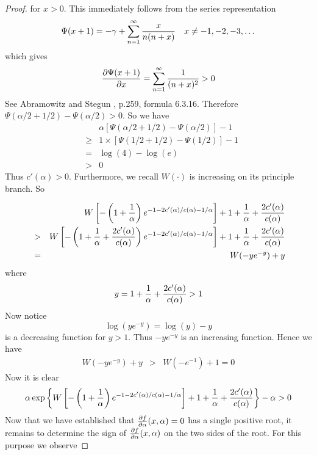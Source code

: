 \begin{subappendices}
\begin{proof}
\begin{minipage}{0.5\textwidth}
    for $x > 0$. This immediately follows from the series
    representation
    \[
    \Psi(x + 1) = -\gamma + \sum_{n=1}^\infty {x \over n(n + x)}
    \quad x \neq -1, -2, -3,\dots
    \]
    which gives
    \[
    {\partial \Psi(x + 1) \over \partial x}
    = \sum_{n=1}^\infty {1 \over (n + x)^2} > 0
    \]
    See Abramowitz and Stegun \cite{abramowitz1972handbook}, p.259,
    formula 6.3.16. Therefore $\Psi(\alpha/2 + 1/2) - \Psi(\alpha/2) > 0$.
    So we have
    \begin{eqnarray*}
      && \alpha \left[
        \Psi(\alpha/2 + 1/2) - \Psi(\alpha/2)
      \right] - 1 \\
      &\geq& 1 \times \left[
        \Psi(1/2 + 1/2) - \Psi(1/2)
      \right] - 1 \\
      &=& \log(4) - \log(e) \\
      &>& 0
    \end{eqnarray*}
    Thus $c'(\alpha) > 0$. Furthermore, we recall
    $W(\cdot)$ is increasing on its principle branch. So
  \end{minipage}
  \begin{eqnarray*}
    &&
    W\left[
      -\left( 1 + {1 \over \alpha} \right)
      e^{-1 - 2 c'(\alpha)/c(\alpha) - 1/\alpha}
    \right]
    + 1 + {1 \over \alpha} + {2 c'(\alpha) \over c(\alpha)} \\
    &>& 
    W\left[
      -\left( 1 + {1 \over \alpha} + {2 c'(\alpha) \over c(\alpha)} \right)
      e^{-1 - 2 c'(\alpha)/c(\alpha) - 1/\alpha}
    \right]
    + 1 + {1 \over \alpha} + {2 c'(\alpha) \over c(\alpha)} \\
    &=& W(-y e^{-y}) + y
  \end{eqnarray*}
  where
  \[
  y = 1 + {1 \over \alpha} + {2 c'(\alpha) \over c(\alpha)} > 1
  \]
  Now notice
  \[
  \log(y e^{-y}) = \log(y) - y
  \]
  is a decreasing function for $y > 1$. Thus $-y e^{-y}$ is an
  increasing function. Hence we have
  \begin{eqnarray*}
    W(-y e^{-y}) + y &>& W(-e^{-1}) + 1 = 0
  \end{eqnarray*}
  Now it is clear
  \[
  \alpha\exp\left\{
    W\left[
      -\left(1 + {1 \over \alpha}\right)
      e^{-1 - 2 c'(\alpha)/c(\alpha) - 1/\alpha}
    \right]
    + 1 + {1 \over \alpha} + {2 c'(\alpha) \over c(\alpha)}
  \right\} - \alpha > 0
  \]
  Now that we have established that ${\partial f \over \partial \alpha}(x,
  \alpha) = 0$ has a single positive root, it remains to determine the
  sign of ${\partial f \over \partial \alpha}(x, \alpha)$ on the two sides of
  the root. For this purpose we observe

\end{proof}
\end{subappendices}
